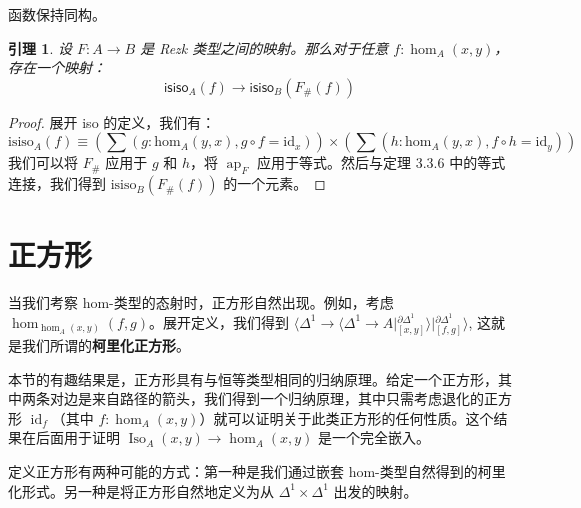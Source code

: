 \documentclass{ctexrep}
\theoremstyle{plain}
\newtheorem{lemma}[theorem]{引理}
\theoremstyle{definition}
\theoremstyle{remark}
\theoremstyle{definition}
\theoremstyle{definition}
\theoremstyle{definition}
\newcommand{\ap}{\operatorname{ap}}
\newcommand{\id}{\operatorname{id}}
\newcommand{\Iso}{\operatorname{Iso}}
\begin{document}
函数保持同构。

\begin{lemma}
设 $F:A\to B$ 是 Rezk 类型之间的映射。那么对于任意 $f:\hom_A(x,y)$，存在一个映射：
\[
\textsf{isiso}_A(f) \to \textsf{isiso}_B(F_\#(f))
\]
\end{lemma}

\begin{proof}
展开 \textrm{iso} 的定义，我们有：
\[
\text{isiso}_A(f) \equiv \left( \sum (g : \text{hom}_A(y, x), g \circ f = \text{id}_x) \right) \times \left( \sum (h : \text{hom}_A(y, x), f \circ h = \text{id}_y) \right)
\]
我们可以将 $F_{\#}$ 应用于 $g$ 和 $h$，将 $\ap_F$ 应用于等式。然后与定理 3.3.6 中的等式连接，我们得到 $\text{isiso}_B(F_{\#}(f))$ 的一个元素。
\end{proof}

\section{正方形}

当我们考察 hom-类型的态射时，正方形自然出现。例如，考虑 $\hom_{\hom_A(x,y)}(f,g)$。展开定义，我们得到
$
\Big\langle \Delta^1 \to \Big\langle \Delta^1 \to A \mathrel{\Big|} {}_{[x,y]}^{\partial\Delta^1} \Big\rangle \mathrel{\Big|} {}_{[f,g]}^{\partial\Delta^1} \Big\rangle
$,
这就是我们所谓的\textbf{柯里化正方形}。

本节的有趣结果是，正方形具有与恒等类型相同的归纳原理。给定一个正方形，其中两条对边是来自路径的箭头，我们得到一个归纳原理，其中只需考虑退化的正方形 $\id_f$（其中 $f:\hom_A(x,y)$）就可以证明关于此类正方形的任何性质。这个结果在后面用于证明 $\Iso_A(x,y) \to \hom_A(x,y)$ 是一个完全嵌入。

定义正方形有两种可能的方式：第一种是我们通过嵌套 hom-类型自然得到的柯里化形式。另一种是将正方形自然地定义为从 $\Delta^1 \times \Delta^1$ 出发的映射。
\end{document}
